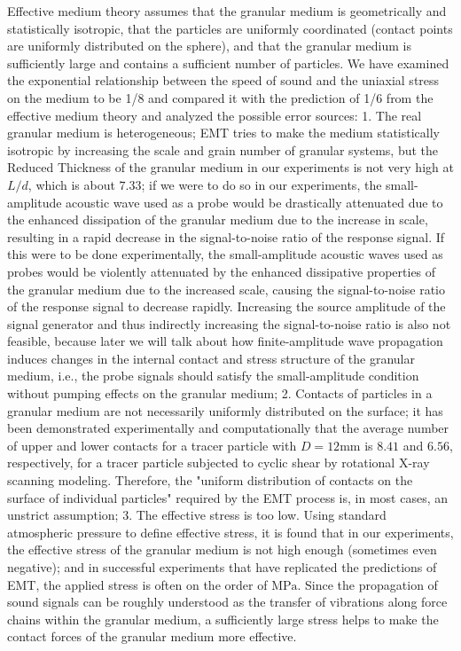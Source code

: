 \begin{digest}
    Effective medium theory assumes that the granular medium is geometrically and statistically isotropic, that the particles are uniformly coordinated (contact points are uniformly distributed on the sphere), and that the granular medium is sufficiently large and contains a sufficient number of particles. We have examined the exponential relationship between the speed of sound and the uniaxial stress on the medium to be 1/8 and compared it with the prediction of 1/6 from the effective medium theory and analyzed the possible error sources:
    1. The real granular medium is heterogeneous; EMT tries to make the medium statistically isotropic by increasing the scale and grain number of granular systems, but the Reduced Thickness of the granular medium in our experiments is not very high at $L/d$, which is about $7.33$; if we were to do so in our experiments, the small-amplitude acoustic wave used as a probe would be drastically attenuated due to the enhanced dissipation of the granular medium due to the increase in scale, resulting in a rapid decrease in the signal-to-noise ratio of the response signal. If this were to be done experimentally, the small-amplitude acoustic waves used as probes would be violently attenuated by the enhanced dissipative properties of the granular medium due to the increased scale, causing the signal-to-noise ratio of the response signal to decrease rapidly. Increasing the source amplitude of the signal generator and thus indirectly increasing the signal-to-noise ratio is also not feasible, because later we will talk about how finite-amplitude wave propagation induces changes in the internal contact and stress structure of the granular medium, i.e., the probe signals should satisfy the small-amplitude condition without pumping effects on the granular medium; 
    2. Contacts of particles in a granular medium are not necessarily uniformly distributed on the surface; it has been demonstrated experimentally and computationally that the average number of upper and lower contacts for a tracer particle with $D=12\unit{\milli\meter}$ is $8.41$ and $6.56$, respectively, for a tracer particle subjected to cyclic shear by rotational X-ray scanning modeling. Therefore, the "uniform distribution of contacts on the surface of individual particles" required by the EMT process is, in most cases, an unstrict assumption;
    3. The effective stress is too low. Using standard atmospheric pressure to define effective stress, it is found that in our experiments, the effective stress of the granular medium is not high enough (sometimes even negative); and in successful experiments that have replicated the predictions of EMT, the applied stress is often on the order of $\unit{\mega\pascal}$. Since the propagation of sound signals can be roughly understood as the transfer of vibrations along force chains within the granular medium, a sufficiently large stress helps to make the contact forces of the granular medium more effective.


\end{digest}
